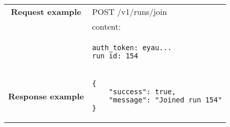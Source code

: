\begin{adjustwidth}{1cm}{}
\begin{longtable}{|c|l|}
                               \textbf{Request example}
             & POST /v1/runs/join \\
             & content: \\
            & \begin{minipage}[t]{0.5\textwidth}
                \begin{adjustwidth}{1.5cm}{}
                \begin{verbatim}
auth_token: eyau...
run_id: 154
                \end{verbatim}
                \end{adjustwidth}
              \end{minipage} \\
            \hline
             \textbf{Response example} & 
              \begin{minipage}[t]{0.5\textwidth}
                \begin{adjustwidth}{1.5cm}{}
                \begin{verbatim}
{
    "success": true, 
    "message": "Joined run 154"
}
                \end{verbatim}
                \end{adjustwidth}
              \end{minipage} \\
              \hline
 
 
 
            \end{longtable}
        \end{adjustwidth}
    

